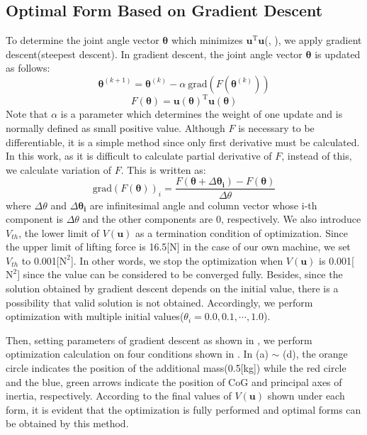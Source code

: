 \subsection{Optimal Form Based on Gradient Descent}
To determine the joint angle vector $\bm{\theta}$ which minimizes $\bm{u}^\mathrm{T}\bm{u}$(, ), we apply gradient descent(steepest descent)\cite{OZEKI2003}. In gradient descent, the joint angle vector $\bm{\theta}$ is updated as follows:
\begin{equation}
  \bm{\theta}^{(k+1)} = \bm{\theta}^{(k)}-\alpha \ \text{grad}(F(\bm{\theta}^{(k)}))
  \label{eq:steepest_descent_method}
\end{equation}
\begin{equation*}
  F(\bm{\theta})=\bm{u}(\bm{\theta})^\mathrm{T}\bm{u}(\bm{\theta})
\end{equation*}
Note that $\alpha$ is a parameter which determines the weight of one update and is normally defined as small positive value. Although $F$ is necessary to be differentiable, it is a simple method since only first derivative must be calculated. In this work, as it is difficult to calculate partial derivative of $F$, instead of this, we calculate variation of $F$. This is written as:
\begin{equation}
  \text{grad}(F(\bm{\theta}))_i=\frac{F(\bm{\theta}+\Delta \bm{\theta_i})-F(\bm{\theta})}{\Delta \theta}
  \label{eq:grad}
\end{equation}
where $\Delta \theta$ and $\Delta \bm{\theta_i}$ are infinitesimal angle and column vector whose i-th component is $\Delta \theta$ and the other components are 0, respectively. We also introduce $V_{th}$, the lower limit of $V(\bm{u})$ as a termination condition of optimization. Since the upper limit of lifting force is 16.5[N] in the case of our own machine, we set $V_{th}$ to 0.001[$\text{N}^2$]. In other words, we stop the optimization when $V(\bm{u})$ is 0.001[$\text{N}^2$] since the value can be considered to be converged fully. Besides, since the solution obtained by gradient descent depends on the initial value, there is a possibility that valid solution is not obtained. Accordingly, we perform optimization with multiple initial values($\theta_i = 0.0, 0.1, \cdots, 1.0$). 
\par
Then, setting parameters of gradient descent as shown in , we perform optimization calculation on four conditions shown in . In (a) $\sim$ (d), the orange circle indicates the position of the additional mass(0.5[kg]) while the red circle and the blue, green arrows indicate the position of CoG and principal axes of inertia, respectively. According to the final values of $V(\bm{u})$ shown under each form, it is evident that the optimization is fully performed and optimal forms can be obtained by this method.

